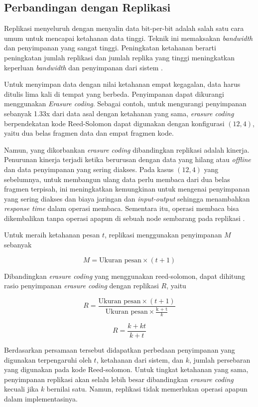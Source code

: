 \subsection{Perbandingan dengan Replikasi}

Replikasi menyeluruh dengan menyalin data bit-per-bit adalah salah satu cara umum untuk mencapai ketahanan data tinggi. Teknik ini memaksakan \textit{bandwidth} dan penyimpanan yang sangat tinggi. Peningkatan ketahanan berarti peningkatan jumlah replikasi dan jumlah replika yang tinggi meningkatkan keperluan \textit{bandwidth} dan penyimpanan dari sistem \parencite{weatherspoon2002erasure}.

Untuk menyimpan data dengan nilai ketahanan empat kegagalan, data harus ditulis lima kali di tempat yang berbeda. Penyimpanan dapat dikurangi menggunakan \textit{Erasure coding}. Sebagai contoh, untuk mengurangi penyimpanan sebanyak 1.33x dari data asal dengan ketahanan yang sama, \textit{erasure coding} berpendekatan kode Reed-Solomon dapat digunakan dengan konfigurasi $(12, 4)$, yaitu dua belas fragmen data dan empat fragmen kode.

Namun, yang dikorbankan \textit{erasure coding} dibandingkan replikasi adalah kinerja. Penurunan kinerja terjadi ketika berurusan dengan data yang hilang atau \textit{offline} dan data penyimpanan yang sering diakses. Pada kasus $(12, 4)$ yang sebelumnya, untuk membangun ulang data perlu membaca dari dua belas fragmen terpisah, ini meningkatkan kemungkinan untuk mengenai penyimpanan yang sering diakses dan biaya jaringan dan \textit{input-output} sehingga menambahkan \textit{response time} dalam operasi membaca. Sementara itu, operasi membaca bisa dikembalikan tanpa operasi apapun di sebuah node sembarang pada replikasi \parencite{huang2012erasure}.

Untuk meraih ketahanan pesan $t$, replikasi menggunakan penyimpanan $M$ sebanyak

\[M = \text{Ukuran pesan} \times (t + 1)\]

Dibandingkan \textit{erasure coding} yang menggunakan reed-solomon, dapat dihitung rasio penyimpanan \textit{erasure coding} dengan replikasi $R$, yaitu

\[R = \frac{\text{Ukuran pesan} \times (t + 1)}{\text{Ukuran pesan} \times \frac{\text{k + t}}{k}} \]


\[R = \frac{k + kt}{k + t}\]

Berdasarkan persamaan tersebut didapatkan perbedaan penyimpanan yang digunakan terpengaruhi oleh $t$, ketahanan dari sistem, dan $k$, jumlah persebaran yang digunakan pada kode Reed-solomon. Untuk tingkat ketahanan yang sama, penyimpanan replikasi akan selalu lebih besar dibandingkan \textit{erasure coding} kecuali jika $k$ bernilai satu. Namun, replikasi tidak memerlukan operasi apapun dalam implementasinya.
